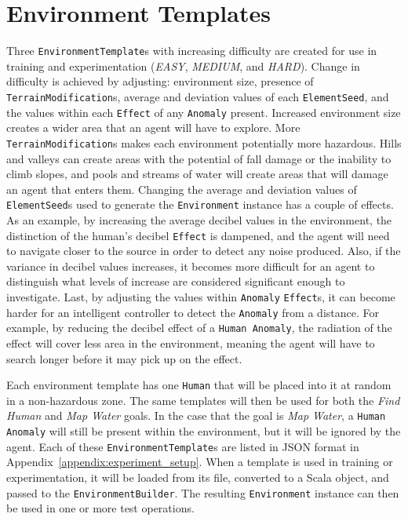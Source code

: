 \section{Environment Templates} \label{sec:test_environment_templates}
Three \texttt{EnvironmentTemplate}s with increasing difficulty are created for use in training and experimentation (\textit{EASY}, \textit{MEDIUM}, and \textit{HARD}).
Change in difficulty is achieved by adjusting: environment size, presence of \texttt{TerrainModification}s, average and deviation values of each \texttt{ElementSeed}, and the values within each \texttt{Effect} of any \texttt{Anomaly} present.
Increased environment size creates a wider area that an agent will have to explore.
More \texttt{TerrainModification}s makes each environment potentially more hazardous.
Hills and valleys can create areas with the potential of fall damage or the inability to climb slopes, and pools and streams of water will create areas that will damage an agent that enters them.
Changing the average and deviation values of \texttt{ElementSeed}s used to generate the \texttt{Environment} instance has a couple of effects.
As an example, by increasing the average decibel values in the environment, the distinction of the human's decibel \texttt{Effect} is dampened, and the agent will need to navigate closer to the source in order to detect any noise produced.
Also, if the variance in decibel values increases, it becomes more difficult for an agent to distinguish what levels of increase are considered significant enough to investigate.
Last, by adjusting the values within \texttt{Anomaly} \texttt{Effect}s, it can become harder for an intelligent controller to detect the \texttt{Anomaly} from a distance.
For example, by reducing the decibel effect of a \texttt{Human Anomaly}, the radiation of the effect will cover less area in the environment, meaning the agent will have to search longer before it may pick up on the effect.

Each environment template has one \texttt{Human} that will be placed into it at random in a non-hazardous zone.
The same templates will then be used for both the \textit{Find Human} and \textit{Map Water} goals.
In the case that the goal is \textit{Map Water}, a \texttt{Human Anomaly} will still be present within the environment, but it will be ignored by the agent.
Each of these \texttt{EnvironmentTemplate}s are listed in JSON format in Appendix~\ref{appendix:experiment_setup}.
When a template is used in training or experimentation, it will be loaded from its file, converted to a Scala object, and passed to the \texttt{EnvironmentBuilder}.
The resulting \texttt{Environment} instance can then be used in one or more test operations.


